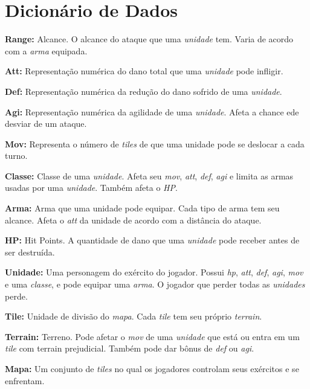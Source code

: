 \section{Dicionário de Dados}

\newcommand{\itemm}[1]{\item\textbf{#1: }}

\begin{itemise}
    \itemm{Range} Alcance. O alcance do ataque que uma \emph{unidade} tem. Varia de
        acordo com a \emph{arma} equipada.
    \itemm{Att} Representação numérica do dano total que uma \emph{unidade} pode
        infligir.
    \itemm{Def} Representação numérica da redução do dano sofrido de uma
        \emph{unidade}.
    \itemm{Agi} Representação numérica da agilidade de uma \emph{unidade}. Afeta a
        chance ede desviar de um ataque.
    \itemm{Mov} Representa o número de \emph{tiles} de que uma unidade pode se
        deslocar a cada turno.
    \itemm{Classe} Classe de uma \emph{unidade}. Afeta seu \emph{mov}, \emph{att},
        \emph{def}, \emph{agi} e limita as armas usadas por uma \emph{unidade}.
        Também afeta o \emph{HP}.
    \itemm{Arma} Arma que uma unidade pode equipar. Cada tipo de arma tem seu alcance.
        Afeta o \emph{att} da unidade de acordo com a distância do ataque.
    \itemm{HP} Hit Points. A quantidade de dano que uma \emph{unidade} pode receber
        antes de ser destruída.
    \itemm{Unidade} Uma personagem do exército do jogador. Possui \emph{hp}, 
        \emph{att}, \emph{def}, \emph{agi}, \emph{mov} e uma \emph{classe}, e pode
        equipar uma \emph{arma}. O jogador que perder todas as \emph{unidades} perde.
    \itemm{Tile} Unidade de divisão do \emph{mapa}. Cada \emph{tile} tem seu próprio
        \emph{terrain}.
    \itemm{Terrain} Terreno. Pode afetar o \emph{mov} de uma \emph{unidade} que está
        ou entra em um \emph{tile} com terrain prejudicial. Também pode dar bônus
        de \emph{def} ou \emph{agi}.
    \itemm{Mapa} Um conjunto de \emph{tiles} no qual os jogadores controlam seus
        exércitos e se enfrentam.
\end{itemise}